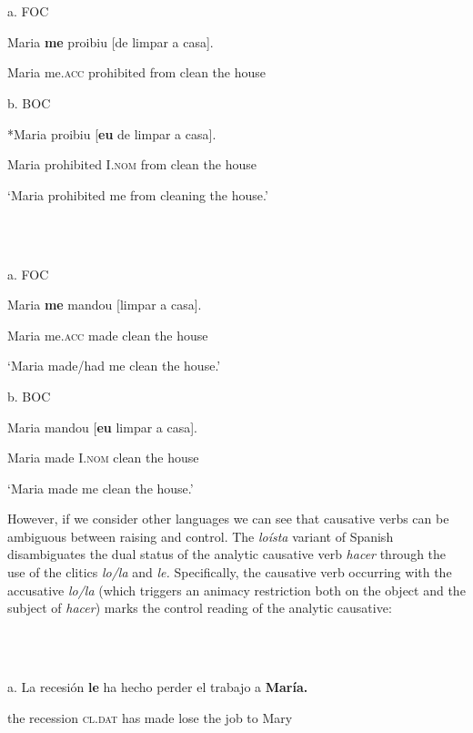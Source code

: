 \documentclass[output=paper]{langsci/langscibook}
\begin{document}
\ea%
    \label{ex:key:5}
    \gll\\
        \\
    \glt
    \z

          a.   FOC

Maria \textbf{me}         proibiu      [de      limpar a    casa].    

  Maria me.\textsc{acc}  prohibited from   clean   the house

b.  BOC

*Maria proibiu   [\textbf{eu}       de    limpar a   casa].    

    Maria   prohibited   I.\textsc{nom}  from clean  the house

    ‘Maria prohibited me from cleaning the house.’

\ea%
    \label{ex:key:6}
    \gll\\
        \\
    \glt
    \z

          a.  FOC

Maria  \textbf{me}        mandou  [limpar a    casa].      

    Maria  me.\textsc{acc} made       clean   the house

    ‘Maria made/had me clean the house.’

b.  BOC

Maria mandou [\textbf{eu}        limpar a   casa].      

    Maria made       I.\textsc{nom}  clean  the house

‘Maria made me clean the house.’

However, if we consider other languages we can see that causative verbs can be ambiguous between raising and control. The \textit{loísta} variant of Spanish disambiguates the dual status of the analytic causative verb \textit{hacer} through the use of the clitics \textit{lo/la} and \textit{le.} Specifically, the causative verb occurring with the accusative \textit{lo/la} (which triggers an animacy restriction both on the object and the subject of \textit{hacer}) marks the control reading of the analytic causative:

\ea%
    \label{ex:key:7}
    \gll\\
        \\
    \glt
    \z

          a.  La  recesión  \textbf{le}          ha  hecho perder el   trabajo  a  \textbf{María.}   

the recession \textsc{cl.dat} has made lose     the  job       to Mary
\end{document}

